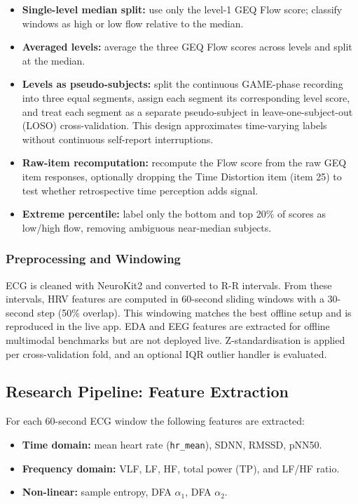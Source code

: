 \begin{itemize}
    \item \textbf{Single-level median split:} use only the level-1 GEQ Flow score; classify windows as high or low flow relative to the median.
    \item \textbf{Averaged levels:} average the three GEQ Flow scores across levels and split at the median.
    \item \textbf{Levels as pseudo-subjects:} split the continuous GAME-phase recording into three equal segments, assign each segment its corresponding level score, and treat each segment as a separate pseudo-subject in leave-one-subject-out (LOSO) cross-validation. This design approximates time-varying labels without continuous self-report interruptions.
    \item \textbf{Raw-item recomputation:} recompute the Flow score from the raw GEQ item responses, optionally dropping the Time Distortion item (item 25) to test whether retrospective time perception adds signal.
    \item \textbf{Extreme percentile:} label only the bottom and top 20\% of scores as low/high flow, removing ambiguous near-median subjects.
\end{itemize}

\subsubsection{Preprocessing and Windowing}

ECG is cleaned with NeuroKit2 \autocite{makowski2021neurokit2} and converted to R-R intervals. From these intervals, HRV features are computed in 60-second sliding windows with a 30-second step (50\% overlap). This windowing matches the best offline setup and is reproduced in the live app. EDA and EEG features are extracted for offline multimodal benchmarks but are not deployed live. Z-standardisation is applied per cross-validation fold, and an optional IQR outlier handler is evaluated.

\subsection{Research Pipeline: Feature Extraction}

For each 60-second ECG window the following features are extracted:

\begin{itemize}
    \item \textbf{Time domain:} mean heart rate (\texttt{hr\_mean}), SDNN, RMSSD, pNN50.
    \item \textbf{Frequency domain:} VLF, LF, HF, total power (TP), and LF/HF ratio.
    \item \textbf{Non-linear:} sample entropy, DFA $\alpha_1$, DFA $\alpha_2$.
\end{itemize}

